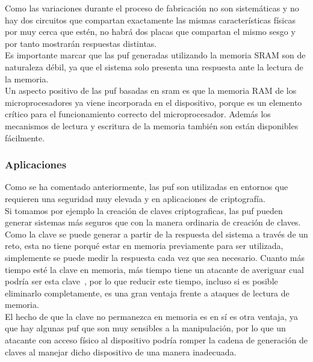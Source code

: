 \documentclass[spanish]{template/minim}
\begin{document}
Como las variaciones durante el proceso de fabricación no son sistemáticas y no hay dos circuitos que compartan exactamente las mismas características físicas por muy cerca que estén, no habrá dos placas que compartan el mismo sesgo y por tanto mostrarán respuestas distintas.\\

Es importante marcar que las \gls{puf} generadas utilizando la memoria SRAM son de naturaleza débil, ya que el sistema solo presenta una respuesta ante la lectura de la memoria.\\

Un aspecto positivo de las \gls{puf} basadas en \gls{sram} es que la memoria RAM de los microprocesadores ya viene incorporada en el dispositivo, porque es un elemento crítico para el funcionamiento correcto del microprocesador. Además los mecanismos de lectura y escritura de la memoria también son están disponibles fácilmente.\\

\subsubsection{Aplicaciones}

Como se ha comentado anteriormente, las \gls{puf} son utilizadas en entornos que requieren una seguridad muy elevada y en aplicaciones de criptografía.\\

Si tomamos por ejemplo la creación de claves criptograficas, las \gls{puf} pueden generar sistemas más seguros que con la manera ordinaria de creación de claves. Como la clave se puede generar a partir de la respuesta del sistema a través de un reto, esta no tiene porqué estar en memoria previamente para ser utilizada, simplemente se puede medir la respuesta cada vez que sea necesario. Cuanto más tiempo esté la clave en memoria, más tiempo tiene un atacante de averiguar cual podría ser esta clave~, por lo que reducir este tiempo, incluso si es posible eliminarlo completamente, es una gran ventaja frente a ataques de lectura de memoria.\\

El hecho de que la clave no permanezca en memoria es en sí es otra ventaja, ya que hay algunas \gls{puf} que son muy sensibles a la manipulación, por lo que un atacante con acceso físico al dispositivo podría romper la cadena de generación de claves al manejar dicho dispositivo de una manera inadecuada.\\
\end{document}
